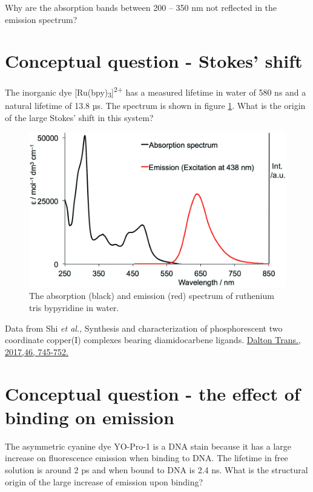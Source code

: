 \documentclass[
]{book}
\begin{document}
Why are the absorption bands between 200 -- 350 nm not reflected in the emission spectrum?

\hypertarget{sec:stokes}{%
\section{Conceptual question - Stokes' shift}\label{sec:stokes}}

The inorganic dye {[}Ru(bpy)\textsubscript{3}{]}\textsuperscript{2+} has a measured lifetime in water of 580 ns and a natural lifetime of 13.8 µs. The spectrum is shown in figure \ref{fig:Rubpyspec}. What is the origin of the large Stokes' shift in this system?

\begin{figure}

{\centering \includegraphics[width=0.7\linewidth]{images/Rubpy3spectra} 

}

\caption{The absorption (black) and emission (red) spectrum of ruthenium tris bypyridine in water.}\label{fig:Rubpyspec}
\end{figure}

Data from Shi \emph{et al.}, Synthesis and characterization of phosphorescent two coordinate copper(I) complexes bearing diamidocarbene ligands. \href{https://doi.org/10.1039/C6DT04016K}{Dalton Trans., 2017,46, 745-752.}

\hypertarget{sec:binding}{%
\section{Conceptual question - the effect of binding on emission}\label{sec:binding}}

The asymmetric cyanine dye YO-Pro-1 is a DNA stain because it has a large increase on fluorescence emission when binding to DNA. The lifetime in free solution is around 2 ps and when bound to DNA is 2.4 ns. What is the structural origin of the large increase of emission upon binding?
\end{document}
